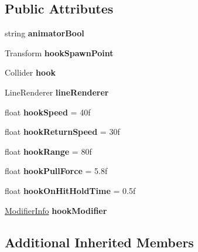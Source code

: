 \subsection*{Public Attributes}
\begin{DoxyCompactItemize}
\item 
\hypertarget{class_hook_shot_ae9ac13a73ca90b9f6fa42205e5a6384c}{}\label{class_hook_shot_ae9ac13a73ca90b9f6fa42205e5a6384c} 
string {\bfseries animator\+Bool}
\item 
\hypertarget{class_hook_shot_abbdcd456c3dfaf178aba9b0b28f5035a}{}\label{class_hook_shot_abbdcd456c3dfaf178aba9b0b28f5035a} 
Transform {\bfseries hook\+Spawn\+Point}
\item 
\hypertarget{class_hook_shot_ae3911a362910bddb3c0c0ff55b015b2f}{}\label{class_hook_shot_ae3911a362910bddb3c0c0ff55b015b2f} 
Collider {\bfseries hook}
\item 
\hypertarget{class_hook_shot_af890f587247522dc3cde3ac762f421ad}{}\label{class_hook_shot_af890f587247522dc3cde3ac762f421ad} 
Line\+Renderer {\bfseries line\+Renderer}
\item 
\hypertarget{class_hook_shot_abe6e4e66acb3217bc95f3d329a13aea1}{}\label{class_hook_shot_abe6e4e66acb3217bc95f3d329a13aea1} 
float {\bfseries hook\+Speed} = 40f
\item 
\hypertarget{class_hook_shot_af8ef93dc6e30a6955adfd7499d900f6f}{}\label{class_hook_shot_af8ef93dc6e30a6955adfd7499d900f6f} 
float {\bfseries hook\+Return\+Speed} = 30f
\item 
\hypertarget{class_hook_shot_a3c14c478e354e6028190a6452f79fa53}{}\label{class_hook_shot_a3c14c478e354e6028190a6452f79fa53} 
float {\bfseries hook\+Range} = 80f
\item 
\hypertarget{class_hook_shot_a76002356db6979d2c81715ebf97c4906}{}\label{class_hook_shot_a76002356db6979d2c81715ebf97c4906} 
float {\bfseries hook\+Pull\+Force} = 5.\+8f
\item 
\hypertarget{class_hook_shot_a0c5717c9f853815da76d80f8f2a3ccf4}{}\label{class_hook_shot_a0c5717c9f853815da76d80f8f2a3ccf4} 
float {\bfseries hook\+On\+Hit\+Hold\+Time} = 0.\+5f
\item 
\hypertarget{class_hook_shot_a2c20a29ca05361e57443ae158b2508b7}{}\label{class_hook_shot_a2c20a29ca05361e57443ae158b2508b7} 
\hyperlink{struct_modifier_info}{Modifier\+Info} {\bfseries hook\+Modifier}
\end{DoxyCompactItemize}
\subsection*{Additional Inherited Members}


